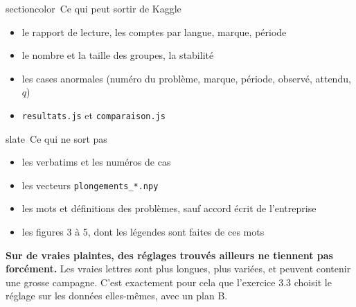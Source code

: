 \begin{tcbraster}[raster columns=2, raster equal height, raster column skip=8pt]
\begin{card}{sectioncolor}{\faSignOut*\ Ce qui peut sortir de Kaggle}
\begin{itemize}[leftmargin=1.3em,itemsep=2pt]
\item[\faCheck] le rapport de lecture, les comptes par langue, marque, période
\item[\faCheck] le nombre et la taille des groupes, la stabilité
\item[\faCheck] les cases anormales (numéro du problème, marque, période, observé, attendu, $q$)
\item[\faCheck] \texttt{resultats.js} et \texttt{comparaison.js}
\end{itemize}
\end{card}
\begin{card}{slate}{\faBan\ Ce qui ne sort pas}
\begin{itemize}[leftmargin=1.3em,itemsep=2pt]
\item[\faTimes] les verbatims et les numéros de cas
\item[\faTimes] les vecteurs \texttt{plongements\_*.npy}
\item[\faTimes] les mots et définitions des problèmes, sauf accord écrit de l'entreprise
\item[\faTimes] les figures 3 à 5, dont les légendes sont faites de ces mots
\end{itemize}
\end{card}
\end{tcbraster}

\begin{piege}
\textbf{Sur de vraies plaintes, des réglages trouvés ailleurs ne tiennent pas forcément.} Les
vraies lettres sont plus longues, plus variées, et peuvent contenir une grosse campagne. C'est exactement
pour cela que l'exercice 3.3 choisit le réglage sur les données elles-mêmes, avec un plan B.
\end{piege}
